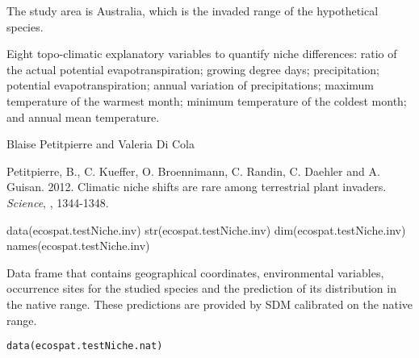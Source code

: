 \documentclass[a4paper]{book}
\begin{document}
%
\begin{Details}\relax
The study area is Australia, which is the invaded range of the hypothetical species.

Eight topo-climatic explanatory variables to quantify niche differences: ratio of the actual potential evapotranspiration; growing degree days; precipitation; potential evapotranspiration; annual variation of precipitations; maximum temperature of the warmest month; minimum temperature of the coldest month; and annual mean temperature.
\end{Details}
%
\begin{Author}\relax
Blaise Petitpierre  and Valeria Di Cola 
\end{Author}
%
\begin{References}\relax
Petitpierre, B., C. Kueffer, O. Broennimann, C. Randin, C. Daehler and A. Guisan. 2012. Climatic niche shifts are rare among terrestrial plant invaders. \emph{Science}, , 1344-1348.
\end{References}
%
\begin{SeeAlso}\relax
{}
\end{SeeAlso}
%
\begin{Examples}
\begin{ExampleCode}
data(ecospat.testNiche.inv)
str(ecospat.testNiche.inv)
dim(ecospat.testNiche.inv)
names(ecospat.testNiche.inv)
\end{ExampleCode}
\end{Examples}
%
\begin{Description}\relax
Data frame that contains geographical coordinates, environmental variables, occurrence sites for the studied species and the prediction of its distribution in the native range. These predictions are provided by SDM calibrated on the native range.
\end{Description}
%
\begin{Usage}
\begin{verbatim}
data(ecospat.testNiche.nat)
\end{verbatim}
\end{Usage}
%
\end{document}
